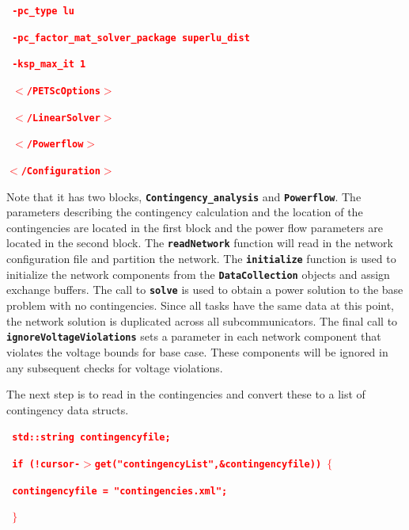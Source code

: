 \documentclass[12pt]{report} %
\begin{document}
\textcolor{red}{\texttt{\textbf{        -pc\_type lu}}}

\textcolor{red}{\texttt{\textbf{        -pc\_factor\_mat\_solver\_package superlu\_dist}}}

\textcolor{red}{\texttt{\textbf{        -ksp\_max\_it 1}}}

\textcolor{red}{\texttt{\textbf{      $\boldsymbol{\mathrm{<}}$/PETScOptions$\boldsymbol{\mathrm{>}}$}}}

\textcolor{red}{\texttt{\textbf{    $\boldsymbol{\mathrm{<}}$/LinearSolver$\boldsymbol{\mathrm{>}}$}}}

\textcolor{red}{\texttt{\textbf{  $\boldsymbol{\mathrm{<}}$/Powerflow$\boldsymbol{\mathrm{>}}$}}}

\textcolor{red}{\texttt{\textbf{$\boldsymbol{\mathrm{<}}$/Configuration$\boldsymbol{\mathrm{>}}$}}}

Note that it has two blocks, \texttt{\textbf{Contingency\_analysis}} and \texttt{\textbf{Powerflow}}. The parameters describing the contingency calculation and the location of the contingencies are located in the first block and the power flow parameters are located in the second block. The \texttt{\textbf{readNetwork}} function will read in the network configuration file and partition the network. The \texttt{\textbf{initialize}} function is used to initialize the network components from the \texttt{\textbf{DataCollection}} objects and assign exchange buffers. The call to \texttt{\textbf{solve}} is used to obtain a power solution to the base problem with no contingencies. Since all tasks have the same data at this point, the network solution is duplicated across all subcommunicators. The final call to \texttt{\textbf{ignoreVoltageViolations}} sets a parameter in each network component that violates the voltage bounds for base case. These components will be ignored in any subsequent checks for voltage violations.

The next step is to read in the contingencies and convert these to a list of contingency data structs.

\textcolor{red}{\texttt{\textbf{  std::string contingencyfile;}}}

\textcolor{red}{\texttt{\textbf{  if (!cursor-$\boldsymbol{\mathrm{>}}$get("contingencyList",\&contingencyfile)) $\boldsymbol{\mathrm{\{}}$}}}

\textcolor{red}{\texttt{\textbf{    contingencyfile = "contingencies.xml";}}}

\textcolor{red}{\texttt{\textbf{  $\boldsymbol{\mathrm{\}}}$}}}
\end{document}
